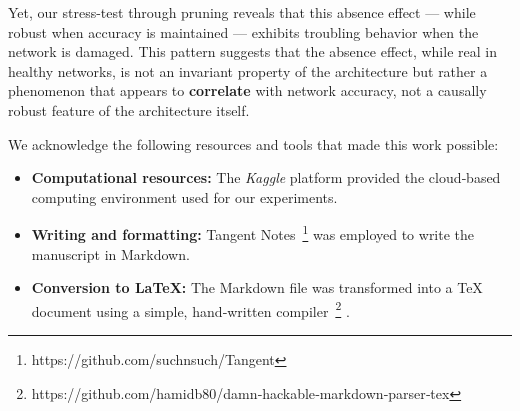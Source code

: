 Yet, our stress-test through pruning reveals that this absence effect — while robust when accuracy is maintained — exhibits troubling behavior when the network is damaged. This pattern suggests that the absence effect, while real in healthy networks, is not an invariant property of the architecture but rather a phenomenon that appears to \textbf{correlate} with network accuracy, not a causally robust feature of the architecture itself.

\begin{acks}

We acknowledge the following resources and tools that made this work possible:

\begin{itemize}
\item \textbf{Computational resources:} The \textit{Kaggle} platform provided the cloud‑based computing environment used for our experiments.
\item \textbf{Writing and formatting:} Tangent Notes  \footnote{https://github.com/suchnsuch/Tangent} was employed to write the manuscript in Markdown.
\item \textbf{Conversion to LaTeX:} The Markdown file was transformed into a TeX document using a simple, hand‑written compiler  \footnote{https://github.com/hamidb80/damn‑hackable‑markdown‑parser‑tex} .
\end{itemize}

\end{acks}